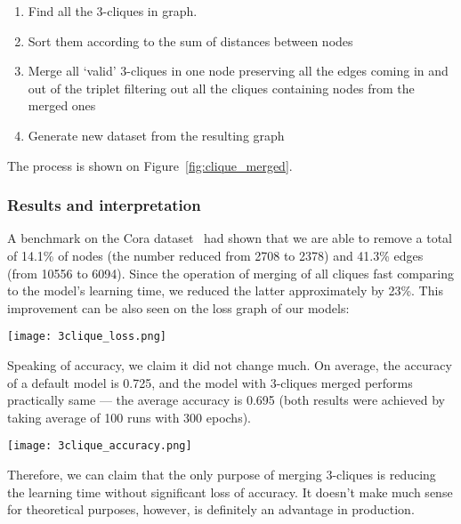 \begin{enumerate}
    \item Find all the 3-cliques in graph.
    \item Sort them according to the sum of distances between nodes
    \item Merge all `valid' 3-cliques in one node preserving all the edges coming in and out of the triplet filtering out all the cliques containing nodes from the merged ones
    \item Generate new dataset from the resulting graph
\end{enumerate}

The process is shown on Figure~\ref{fig:clique_merged}.

\subsubsection*{Results and interpretation}

A benchmark on the Cora dataset~\cite{cora_dataset} had shown that we are able to remove a total of 14.1\% of nodes (the number reduced from 2708 to 2378) and 41.3\% edges (from 10556 to 6094).
Since the operation of merging of all cliques fast comparing to the model's learning time, we reduced the latter approximately by 23\%.
This improvement can be also seen on the loss graph of our models:

\texttt{[image: 3clique\_loss.png]}

Speaking of accuracy, we claim it did not change much.
On average, the accuracy of a default model is 0.725, and the model with 3-cliques merged performs practically same --- the average accuracy is 0.695 (both results were achieved by taking average of 100 runs with 300 epochs).

\texttt{[image: 3clique\_accuracy.png]}

Therefore, we can claim that the only purpose of merging 3-cliques is reducing the learning time without significant loss of accuracy.
It doesn't make much sense for theoretical purposes, however, is definitely an advantage in production.




